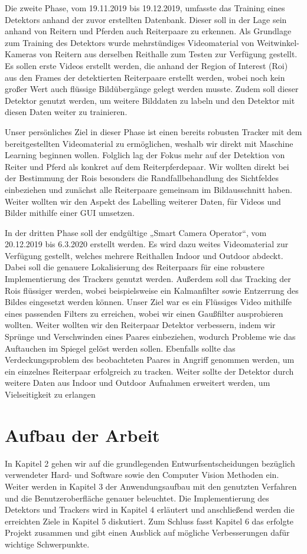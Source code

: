 Die zweite Phase, vom 19.11.2019 bis 19.12.2019, umfasste das Training eines Detektors anhand der zuvor erstellten Datenbank. Dieser soll in der Lage sein anhand von Reitern und Pferden auch Reiterpaare zu erkennen. Als Grundlage zum Training des Detektors wurde mehrstündiges Videomaterial von Weitwinkel-Kameras von Reitern aus derselben Reithalle zum Testen zur Verfügung gestellt. Es sollen erste Videos erstellt werden, die anhand der Region of Interest (Roi) aus den Frames der detektierten Reiterpaare erstellt werden, wobei noch kein großer Wert auch flüssige Bildübergänge gelegt werden musste. Zudem soll dieser Detektor genutzt werden, um weitere Bilddaten zu labeln und den Detektor mit diesen Daten weiter zu trainieren.

Unser persönliches Ziel in dieser Phase ist einen bereits robusten Tracker mit dem bereitgestellten Videomaterial zu ermöglichen, weshalb wir direkt mit Maschine Learning beginnen wollen. Folglich lag der Fokus mehr auf der Detektion von Reiter und Pferd als konkret auf dem Reiterpferdepaar. Wir wollten direkt bei der Bestimmung der Rois besonders die Randfallbehandlung des Sichtfeldes einbeziehen und zunächst alle Reiterpaare gemeinsam im Bildausschnitt haben. Weiter wollten wir den Aspekt des Labelling weiterer Daten, für Videos und Bilder mithilfe einer GUI umsetzen.

In der dritten Phase soll der endgültige „Smart Camera Operator“, vom 20.12.2019 bis 6.3.2020 erstellt werden. Es wird dazu weites Videomaterial zur Verfügung gestellt, welches mehrere Reithallen Indoor und Outdoor abdeckt. Dabei soll die genauere Lokalisierung des Reiterpaars für eine robustere Implementierung des Trackers genutzt werden. Außerdem soll das Tracking der Rois flüssiger werden, wobei beispielsweise ein Kalmanfilter sowie Entzerrung des Bildes eingesetzt werden können.
Unser Ziel war es ein Flüssiges Video mithilfe eines passenden Filters zu erreichen, wobei wir einen Gaußfilter ausprobieren wollten. Weiter wollten wir den Reiterpaar Detektor verbessern, indem wir Sprünge und Verschwinden eines Paares einbeziehen, wodurch Probleme wie das Auftauchen im Spiegel gelöst werden sollen. Ebenfalls sollte das Verdeckungsproblem des beobachteten Paares in Angriff genommen werden, um ein einzelnes Reiterpaar erfolgreich zu tracken. Weiter sollte der Detektor durch weitere Daten aus Indoor und Outdoor Aufnahmen erweitert werden, um Vielseitigkeit zu erlangen



\section{Aufbau der Arbeit}
In Kapitel 2 gehen wir auf die grundlegenden Entwurfsentscheidungen bezüglich verwendeter Hard- und Software sowie den Computer Vision Methoden ein. Weiter werden in Kapitel 3 der Anwendungsaufbau mit den genutzten Verfahren und die Benutzeroberfläche genauer beleuchtet. Die Implementierung des Detektors und Trackers wird in Kapitel 4 erläutert und anschließend werden die erreichten Ziele in Kapitel 5 diskutiert. Zum Schluss fasst Kapitel 6 das erfolgte Projekt zusammen und gibt einen Ausblick auf mögliche Verbesserungen dafür wichtige Schwerpunkte.